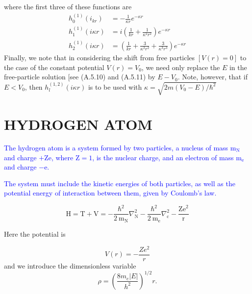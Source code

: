 \documentclass{article}
\begin{document}
where the first three of these functions are
\begin{equation}
\begin{aligned}
h_{0}^{(1)}\left(i_{k r}\right) &=-\frac{1}{\kappa r} e^{-\kappa r} \\
h_{1}^{(1)}(i \kappa r) &=i\left(\frac{1}{k r}+\frac{1}{\kappa^{2} r^{2}}\right) e^{-\kappa r} \\
h_{2}^{(1)}(i \kappa r) &=\left(\frac{1}{k r}+\frac{3}{\kappa^{2} r^{2}}+\frac{3}{\kappa^{3} r^{3}}\right) e^{-\kappa r}
\end{aligned}
\end{equation}
Finally, we note that in considering the shift from free particles $[V(r)=0]$ to the case of the constant potential $V(r)=V_{0}$, we need only replace the $E$ in the free-particle solution [see (A.5.10) and (A.5.11) by $E-V_{0}$. Note, however, that if $E<V_{0}$, then $h_{l}^{(1,2)}(i \kappa r)$ is to be used with $\kappa=\sqrt{2 m\left(V_{0}-E\right) / \hbar^{2}}$

\section{HYDROGEN ATOM}

\textcolor{blue}{The hydrogen atom is a system formed by two particles, a nucleus of mass $\mathrm{m}_{\mathrm{N}} $
and charge $+\mathrm{Ze}$, where $\mathrm{Z}=1$, is the nuclear charge, and an electron of mass $\mathrm{m}_{\mathrm{e}}$ and charge $-\mathrm{e}$.}


\textcolor{blue}{The system must include the kinetic energies of both particles, as well as the potential energy of interaction between them, given by Coulomb's law.}

\begin{equation}
    \mathrm{H}=\mathrm{T}+\mathrm{V}=-\frac{\hbar^{2}}{2 \mathrm{~m}_{\mathrm{N}}} \nabla_{\mathrm{N}}^{2}-\frac{\hbar^{2}}{2 \mathrm{~m}_{\mathrm{e}}} \nabla_{\mathrm{c}}^{2}-\frac{\mathrm{Ze}^{2}}{\mathrm{r}}
\end{equation}

Here the potential is

\begin{equation}
V(r)=-\frac{Z e^{2}}{r}
\end{equation}
and we introduce the dimensionless variable
\begin{equation}
\rho=\left(\frac{8 m_{e}|E|}{h^{2}}\right)^{1 / 2} r.
\end{equation}
\end{document}
